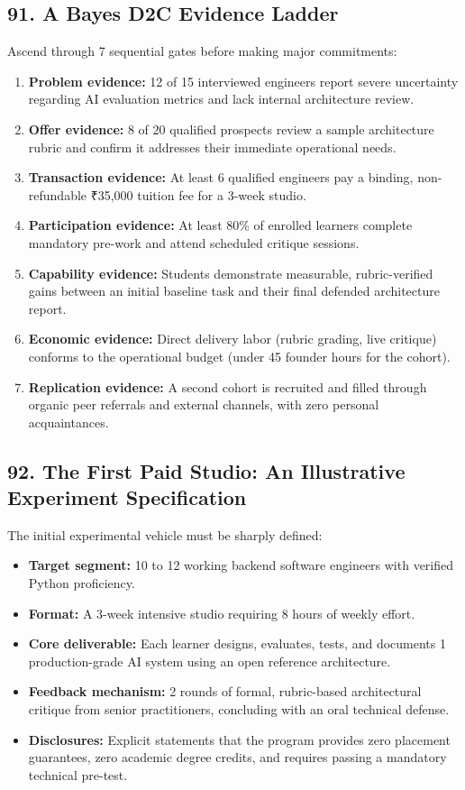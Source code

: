 \subsection*{91. A Bayes D2C Evidence Ladder}

Ascend through 7 sequential gates before making major commitments:

\begin{enumerate}
    \item \textbf{Problem evidence:} 12 of 15 interviewed engineers report severe uncertainty regarding AI evaluation metrics and lack internal architecture review.
    \item \textbf{Offer evidence:} 8 of 20 qualified prospects review a sample architecture rubric and confirm it addresses their immediate operational needs.
    \item \textbf{Transaction evidence:} At least 6 qualified engineers pay a binding, non-refundable ₹35,000 tuition fee for a 3-week studio.
    \item \textbf{Participation evidence:} At least 80\% of enrolled learners complete mandatory pre-work and attend scheduled critique sessions.
    \item \textbf{Capability evidence:} Students demonstrate measurable, rubric-verified gains between an initial baseline task and their final defended architecture report.
    \item \textbf{Economic evidence:} Direct delivery labor (rubric grading, live critique) conforms to the operational budget (under 45 founder hours for the cohort).
    \item \textbf{Replication evidence:} A second cohort is recruited and filled through organic peer referrals and external channels, with zero personal acquaintances.
\end{enumerate}

\subsection*{92. The First Paid Studio: An Illustrative Experiment Specification}

The initial experimental vehicle must be sharply defined:

\begin{itemize}
    \item \textbf{Target segment:} 10 to 12 working backend software engineers with verified Python proficiency.
    \item \textbf{Format:} A 3-week intensive studio requiring 8 hours of weekly effort.
    \item \textbf{Core deliverable:} Each learner designs, evaluates, tests, and documents 1 production-grade AI system using an open reference architecture.
    \item \textbf{Feedback mechanism:} 2 rounds of formal, rubric-based architectural critique from senior practitioners, concluding with an oral technical defense.
    \item \textbf{Disclosures:} Explicit statements that the program provides zero placement guarantees, zero academic degree credits, and requires passing a mandatory technical pre-test.
\end{itemize}

